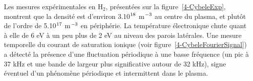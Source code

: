 \begin{refsection}
Les mesures expérimentales en H$_2$, présentées sur la figure~\ref{4-CybeleExp},
montrent que la densité est d'environ 3.10$^{{18}}$ m$^{{-3}}$ au
centre du plasma, et plutôt de l'ordre de 5.10$^{{17}}$ m$^{{-3}}$
en périphérie.
La température électronique chute quant à elle de 6 eV à un peu plus de 2 eV au niveau des parois latérales. Une mesure
temporelle du courant de saturation ionique (voir
figure~\ref{4-CybeleFourierSignal}) a détecté la présence d'une
fluctuation périodique à une basse fréquence (un pic à 37 kHz et une bande de
largeur plus significative autour de 32 kHz), signe éventuel d'un phénomène
périodique et intermittent dans le plasma.
\begin{figure}[!htbp]
  \centering

\end{figure}
\end{refsection}
